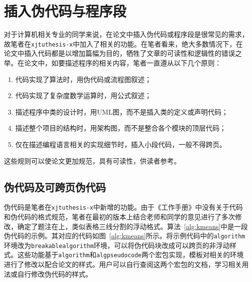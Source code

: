 %
%
%
%
%
%
%

\section{插入伪代码与程序段}
对于计算机相关专业的同学来说，在论文中插入伪代码或程序段是很常见的需求，故笔者在\texttt{xjtuthesis-x}中加入了相关的功能。在笔者看来，绝大多数情况下，在论文中插入代码都是以增加篇幅为目的，牺牲了文章的可读性和逻辑性的错误之举。在论文中，如要描述程序的相关内容，笔者一直遵从以下几个原则：
\begin{enumerate}
  \item 代码实现了算法时，用伪代码或流程图叙述；
  \item 代码实现了复杂度数学运算时，用公式叙述；
  \item 描述程序中类的设计时，用UML图，而不是插入类的定义或声明代码；
  \item 描述整个项目的结构时，用架构图，而不是整合各个模块的顶层代码；
  \item 仅在描述编程语言相关的实现细节时，插入小段代码，一般不得跨页。
\end{enumerate}
这些规则可以使论文更加规范，具有可读性，供读者参考。


\subsection{伪代码及可跨页伪代码}
伪代码是笔者在\texttt{xjtuthesis-x}中新增的功能。由于《工作手册》中没有关于代码和伪代码的格式规范，笔者在最初的版本上结合老师和同学的意见进行了多次修改，确定了题注在上，类似表格三线分割的浮动格式。算法~\ref{alg:kmeans}中是一段伪代码的示例。其对应的代码如图~\ref{alg:kmeans}所示。将示例代码中的\texttt{algorithm}环境改为\texttt{breakablealgorithm}环境，可以将伪代码块改成可以跨页的非浮动样式。这些功能基于\texttt{algorithm}和\texttt{algpseudocode}两个宏包实现，模板对相关的环境进行了修改以配合论文的样式。用户可以自行查阅这两个宏包的文档，学习相关用法或自行修改伪代码的样式。

